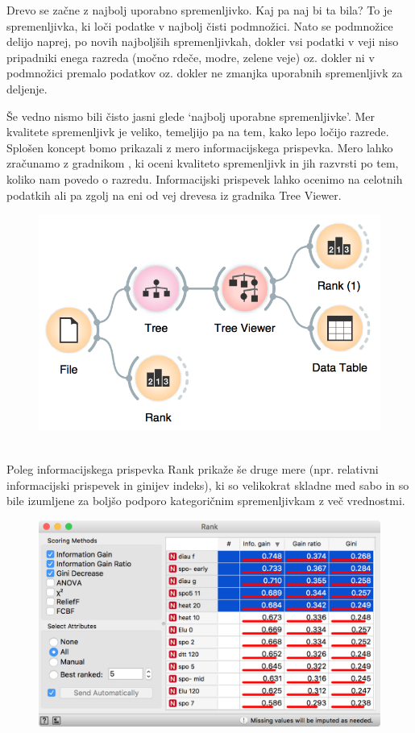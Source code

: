 Drevo se začne z najbolj uporabno spremenljivko. Kaj pa naj bi ta bila? To je spremenljivka, ki loči podatke v najbolj čisti podmnožici. Nato se podmnožice delijo naprej, po novih najboljših spremenljivkah, dokler vsi podatki v veji niso pripadniki enega razreda (močno rdeče, modre, zelene veje) oz. dokler ni v podmnožici premalo podatkov oz. dokler ne zmanjka uporabnih spremenljivk za deljenje.

Še vedno nismo bili čisto jasni glede ‘najbolj uporabne spremenljivke’. Mer kvalitete spremenljivk je veliko, temeljijo pa na tem, kako lepo ločijo razrede. Splošen koncept bomo prikazali z mero informacijskega prispevka. Mero lahko zračunamo z gradnikom , ki oceni kvaliteto spremenljivk in jih razvrsti po tem, koliko nam povedo o razredu. Informacijski prispevek lahko ocenimo na celotnih podatkih ali pa zgolj na eni od vej drevesa iz gradnika Tree Viewer.

\begin{figure}[h]
    \centering
    \includegraphics[width=0.8\linewidth]{workflow2.png}
    \caption{$\;$}
\end{figure}

Poleg informacijskega prispevka Rank prikaže še druge mere (npr. relativni informacijski prispevek in ginijev indeks), ki so velikokrat skladne med sabo in so bile izumljene za boljšo podporo kategoričnim spremenljivkam z več vrednostmi.

\begin{figure}[h]
    \centering
    \includegraphics[width=0.8\linewidth]{rank.png}
    \caption{$\;$}
\end{figure}
